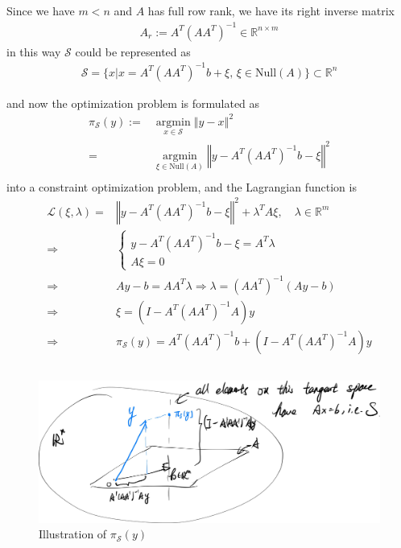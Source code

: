 \documentclass[11pt,a4paper]{ctexart}
\numberwithin{equation}{section}%
\begin{document}
\subsection{}
Since we have $ m<n $ and $ A $ has full row rank, we have its right inverse matrix
\begin{align*}
    A_r := A^T(AA^T)^{-1} \in \mathbb{R}^{n\times m} 
\end{align*}
in this way $ \mathcal{S} $ could be represented as
\begin{align*}
    \mathcal{S} = \{x|x=A^T(AA^T)^{-1}b + \xi  ,\,\xi \in \mathrm{Null}(A)\} \subset \mathbb{R}^n
\end{align*}

and now the optimization problem is formulated as
\begin{align*}
    \pi_\mathcal{S}(y):=&\mathop{ \arg\min }\limits_{x\in\mathcal{S}} \left\Vert y-x \right\Vert ^2\\
    =& \mathop{ \arg\min }\limits_{\xi \in \mathrm{Null}(A)} \left\Vert y-A^T(AA^T)^{-1}b - \xi \right\Vert ^2\\
\end{align*}
into a constraint optimization problem, and the Lagrangian function is
\begin{align*}
    \mathcal{L}(\xi,\lambda) =& \left\Vert y-A^T(AA^T)^{-1}b - \xi \right\Vert ^2 + \lambda^TA\xi,\quad \lambda \in\mathbb{R}^m \\
     \Rightarrow& \begin{cases}
        y-A^T(AA^T)^{-1}b - \xi = A^T\lambda \\
        A\xi = 0
    \end{cases}\\
     \Rightarrow &Ay-b=AA^T\lambda  \Rightarrow \lambda = (AA^T)^{-1}(Ay-b)\\
    \Rightarrow &\xi =(I-A^T(AA^T)^{-1}A)y\\
    \Rightarrow &\pi_\mathcal{S}(y) = A^T(AA^T)^{-1}b + (I-A^T(AA^T)^{-1}A)y
\end{align*}

\subsection{}

\begin{figure}[H]
    \centering
    \includegraphics[width=0.7\linewidth]{HW1Pic1.jpg}
    \caption{Illustration of $ \pi_\mathcal{S}(y) $}
\end{figure}
\end{document}
